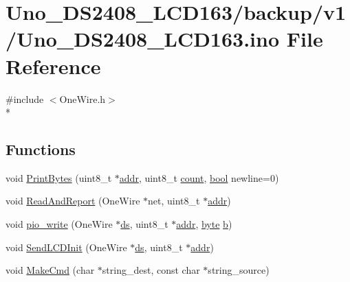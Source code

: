 \hypertarget{backup_2v1_2Uno__DS2408__LCD163_8ino}{\section{Uno\-\_\-\-D\-S2408\-\_\-\-L\-C\-D163/backup/v1/\-Uno\-\_\-\-D\-S2408\-\_\-\-L\-C\-D163.ino File Reference}
\label{backup_2v1_2Uno__DS2408__LCD163_8ino}
}
{\ttfamily \#include $<$One\-Wire.\-h$>$}\\*
\subsection*{Functions}
\begin{DoxyCompactItemize}
\item 
void \hyperlink{backup_2v1_2Uno__DS2408__LCD163_8ino_a7129fd7e5da9d889e1b404ead2db2fc5}{Print\-Bytes} (uint8\-\_\-t $\ast$\hyperlink{OWP__DG__1w-adaptor_8ino_a0fc5da2e63a94559429ec9aec32f1831}{addr}, uint8\-\_\-t \hyperlink{Uno__Dragino__LoRa__GPS__Shield__TTN_8ino_a16ff2d8e15ade4948398b0aeb80124a8}{count}, \hyperlink{stdbool_8h_abb452686968e48b67397da5f97445f5b}{bool} newline=0)
\item 
void \hyperlink{backup_2v1_2Uno__DS2408__LCD163_8ino_adce6de6b0be4134eefba3efa4ca8e7cc}{Read\-And\-Report} (One\-Wire $\ast$net, uint8\-\_\-t $\ast$\hyperlink{OWP__DG__1w-adaptor_8ino_a0fc5da2e63a94559429ec9aec32f1831}{addr})
\item 
void \hyperlink{backup_2v1_2Uno__DS2408__LCD163_8ino_a1e26c3a08c3767822ad391876a888fcf}{pio\-\_\-write} (One\-Wire $\ast$\hyperlink{OWRain1_8ino_af75456870b9486275b406e13b003fb11}{ds}, uint8\-\_\-t $\ast$\hyperlink{OWP__DG__1w-adaptor_8ino_a0fc5da2e63a94559429ec9aec32f1831}{addr}, \hyperlink{Arduino_8h_ab8ef12fab634c171394422d0ee8baf94}{byte} \hyperlink{IMU_8cpp_a20f3a6e8a2ba2537edf801801628417b}{b})
\item 
void \hyperlink{backup_2v1_2Uno__DS2408__LCD163_8ino_a0346e7b740407034d2bd4974762115d5}{Send\-L\-C\-D\-Init} (One\-Wire $\ast$\hyperlink{OWRain1_8ino_af75456870b9486275b406e13b003fb11}{ds}, uint8\-\_\-t $\ast$\hyperlink{OWP__DG__1w-adaptor_8ino_a0fc5da2e63a94559429ec9aec32f1831}{addr})
\item 
void \hyperlink{backup_2v1_2Uno__DS2408__LCD163_8ino_ab8330ae5933821840970969e68e3a258}{Make\-Cmd} (char $\ast$string\-\_\-dest, const char $\ast$string\-\_\-source)

\end{DoxyCompactItemize}
